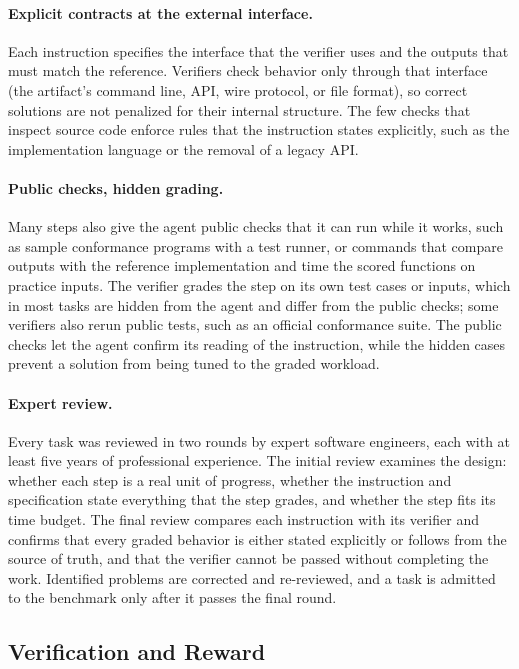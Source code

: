 \documentclass{article}
\begin{document}
\paragraph{Explicit contracts at the external interface.}
Each instruction specifies the interface that the verifier uses and the outputs
that must match the reference. Verifiers check behavior only through that
interface (the artifact's command line, API, wire protocol, or file format), so
correct solutions are not penalized for their internal structure. The few
checks that inspect source code enforce rules that the instruction states
explicitly, such as the implementation language or the removal of a legacy
API.

\paragraph{Public checks, hidden grading.}
Many steps also give the agent public checks that it can run while it works,
such as sample conformance programs with a test runner, or commands that
compare outputs with the reference implementation and time the scored
functions on practice inputs. The verifier grades the step on its own test
cases or inputs, which in most tasks are hidden from the agent and differ from
the public checks; some verifiers also rerun public tests, such as an official
conformance suite. The public checks let the agent confirm its reading of the
instruction, while the hidden cases prevent a solution from being tuned to the
graded workload.

\paragraph{Expert review.}
Every task was reviewed in two rounds by expert software engineers, each with
at least five years of professional experience. The initial
review examines the design: whether each step is a real unit of progress,
whether the instruction and specification state everything that the step
grades, and whether the step fits its time budget. The final review compares
each instruction with its verifier and confirms that every graded behavior is
either stated explicitly or follows from the source of truth, and that the
verifier cannot be passed without completing the work. Identified problems are
corrected and re-reviewed, and a task is admitted to the benchmark only after
it passes the final round.

\subsection{Verification and Reward}
\label{sec:verification}
\end{document}
